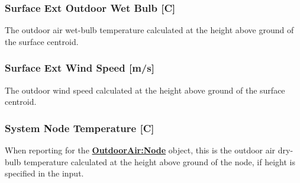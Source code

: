 \subsubsection{Surface Ext Outdoor Wet Bulb {[}C{]}}\label{surface-ext-outdoor-wet-bulb-c}

The outdoor air wet-bulb temperature calculated at the height above ground of the surface centroid.

\subsubsection{Surface Ext Wind Speed {[}m/s{]}}\label{surface-ext-wind-speed-ms}

The outdoor wind speed calculated at the height above ground of the surface centroid.

\subsubsection{System Node Temperature {[}C{]}}\label{system-node-temperature-c}

When reporting for the \textbf{\hyperref[outdoorairnode]{OutdoorAir:Node}} object, this is the outdoor air dry-bulb temperature calculated at the height above ground of the node, if height is specified in the input.
